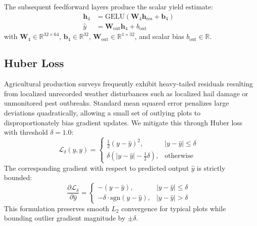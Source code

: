 \documentclass[conference,10pt,letterpaper]{IEEEtran}
\begin{document}
The subsequent feedforward layers produce the scalar yield estimate:
\begin{align}
\mathbf{h}_4 &= \text{GELU}(\mathbf{W}_4 \mathbf{h}_{\text{res}} + \mathbf{b}_4) \\
\hat{y} &= \mathbf{W}_{\text{out}} \mathbf{h}_4 + b_{\text{out}}
\end{align}
with $\mathbf{W}_4 \in \mathbb{R}^{32 \times 64}$, $\mathbf{b}_4 \in \mathbb{R}^{32}$, $\mathbf{W}_{\text{out}} \in \mathbb{R}^{1 \times 32}$, and scalar bias $b_{\text{out}} \in \mathbb{R}$.

\subsection{Huber Loss}
Agricultural production surveys frequently exhibit heavy-tailed residuals resulting from localized unrecorded weather disturbances such as localized hail damage or unmonitored pest outbreaks. Standard mean squared error penalizes large deviations quadratically, allowing a small set of outlying plots to disproportionately bias gradient updates. We mitigate this through Huber loss~\cite{huber1964robust} with threshold $\delta = 1.0$:
\begin{equation}
\mathcal{L}_{\delta}(y, \hat{y}) =
\begin{cases}
\tfrac{1}{2}(y - \hat{y})^2, & |y - \hat{y}| \le \delta \\[3pt]
\delta \left(|y - \hat{y}| - \tfrac{1}{2}\delta\right), & \text{otherwise}
\end{cases}
\end{equation}
The corresponding gradient with respect to predicted output $\hat{y}$ is strictly bounded:
\begin{equation}
\frac{\partial \mathcal{L}_\delta}{\partial \hat{y}} =
\begin{cases}
-(y - \hat{y}), & |y - \hat{y}| \le \delta \\[3pt]
-\delta \cdot \text{sgn}(y - \hat{y}), & |y - \hat{y}| > \delta
\end{cases}
\end{equation}
This formulation preserves smooth $L_2$ convergence for typical plots while bounding outlier gradient magnitude by $\pm\delta$.
\end{document}
